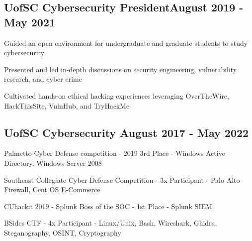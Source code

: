 
\vspace*{8pt}
\subsection{{UofSC Cybersecurity President}\hfill August 2019 - May 2021}
\begin{zitemize}
    \item Guided an open environment for undergraduate and graduate students to study cybersecurity
    \item Presented and led in-depth discussions on security engineering, vulnerability research, and cyber crime
    \item Cultivated hands-on ethical hacking experiences leveraging OverTheWire, HackThisSite, VulnHub, and TryHackMe
\end{zitemize}

\vspace*{10pt}
\subsection{{UofSC Cybersecurity }\hfill August 2017 - May 2022}
\begin{zitemize}
    \item Palmetto Cyber Defense competition - 2019 3rd Place - Windows Active Directory, Windows Server 2008
    \item Southeast Collegiate Cyber Defense Competition - 3x Participant - Palo Alto Firewall, Cent OS E-Commerce
    \item CUhackit 2019 - Splunk Boss of the SOC - 1st Place - Splunk SIEM
    \item BSides CTF - 4x Participant - Linux/Unix, Bash, Wireshark, Ghidra, Steganography, OSINT, Cryptography 
\end{zitemize}